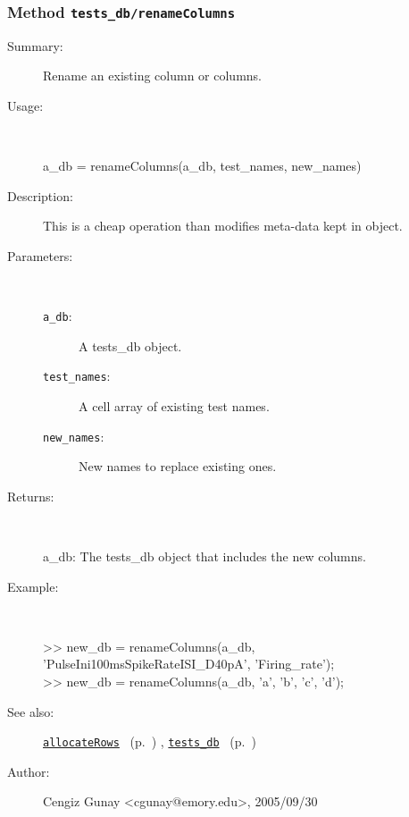 \subsubsection[Method \texttt{renameColumns}]{Method \texttt{tests\_db/renameColumns}}%
%
\label{ref_tests_db__renameColumns}%
\hypertarget{ref_tests_db__renameColumns}{}%
\begin{description}
\item[Summary:]Rename an existing column or columns.
%
\item[Usage:]~%
\begin{lyxcode}%
a\_db = renameColumns(a\_db, test\_names, new\_names)
%
\end{lyxcode}%
%
\item[Description:]%
This is a cheap operation than modifies meta-data kept in object.
\item[Parameters:]~
\begin{description}%
\item[\texttt{a\_db}:]
 A tests\_db object.
\item[\texttt{test\_names}:]
 A cell array of existing test names.
\item[\texttt{new\_names}:]
 New names to replace existing ones.
\end{description}%
%
\item[Returns:]~

	a\_db: The tests\_db object that includes the new columns.
%
\item[Example:]~
\begin{lyxcode} %
 >> new\_db = renameColumns(a\_db, 'PulseIni100msSpikeRateISI\_D40pA', 'Firing\_rate');\\%
 >> new\_db = renameColumns(a\_db, {'a', 'b'}, {'c', 'd'});\\%
\end{lyxcode}
%
\item[See also:]%
\hyperlink{ref_allocateRows}{\texttt{allocateRows}}%
\ (p.~\pageref{ref_allocateRows})%
%
, \hyperlink{ref_tests_db}{\texttt{tests\_db}}%
\ (p.~\pageref{ref_tests_db})%
%
%
\item[Author:]%
Cengiz Gunay <cgunay@emory.edu>, 2005/09/30%
\end{description}
\methodline%
